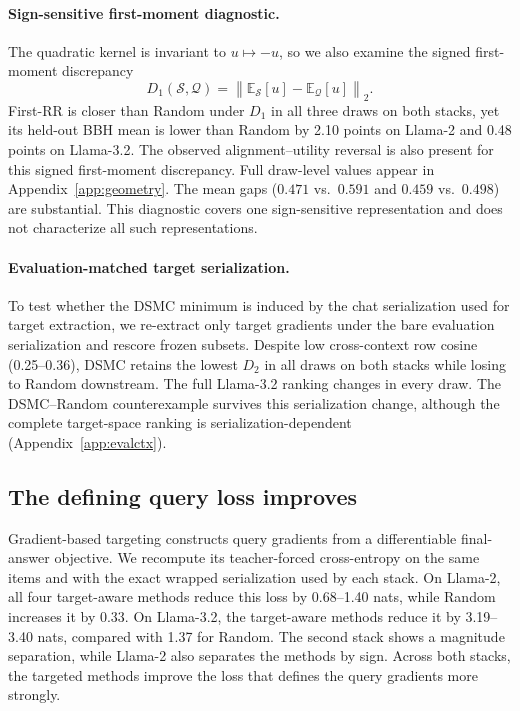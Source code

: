 \documentclass{article}
\newcommand{\method}{\textsc{DSMC}}
\newcommand{\dsecond}{D_2}
\begin{document}
\paragraph{Sign-sensitive first-moment diagnostic.}
The quadratic kernel is invariant to $u\mapsto -u$, so we also examine the
signed first-moment discrepancy
\begin{equation}
    D_1(\mathcal S,\mathcal Q)
    =
    \left\|
    \mathbb E_{\mathcal S}[u]-\mathbb E_{\mathcal Q}[u]
    \right\|_2 .
\end{equation}
First-RR is closer than Random under $D_1$ in all three draws on both stacks,
yet its held-out BBH mean is lower than Random by 2.10 points on Llama-2 and
0.48 points on Llama-3.2. The observed alignment--utility reversal is
also present for this signed first-moment discrepancy. Full draw-level values
appear in Appendix~\ref{app:geometry}. The mean gaps
($0.471$ vs.\ $0.591$ and $0.459$ vs.\ $0.498$) are substantial. This
diagnostic covers one sign-sensitive representation and does not characterize
all such representations.

\paragraph{Evaluation-matched target serialization.}
To test whether the \method{} minimum is induced by the chat serialization
used for target extraction, we re-extract only target gradients under the bare
evaluation serialization and rescore frozen subsets. Despite low cross-context
row cosine (0.25--0.36), \method{} retains the lowest $\dsecond$ in all draws
on both stacks while losing to Random downstream. The full Llama-3.2 ranking
changes in every draw. The \method{}--Random counterexample survives this
serialization change, although the complete target-space ranking is
serialization-dependent (Appendix~\ref{app:evalctx}).

\subsection{The defining query loss improves}

Gradient-based targeting constructs query gradients from a differentiable
final-answer objective. We recompute its teacher-forced cross-entropy on the
same items and with the exact wrapped serialization used by each stack. On
Llama-2, all four target-aware methods reduce this loss by 0.68--1.40 nats,
while Random increases it by 0.33. On Llama-3.2, the target-aware methods
reduce it by 3.19--3.40 nats, compared with 1.37 for Random. The second stack
shows a magnitude separation, while Llama-2 also separates the methods by
sign. Across both stacks, the targeted methods improve the loss that defines
the query gradients more strongly.
\end{document}
